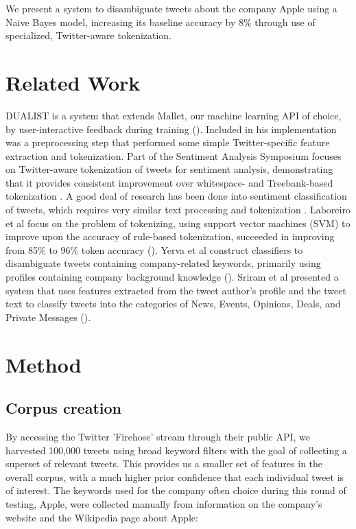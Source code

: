 \documentclass[letterpaper]{article}
\begin{document}
We present a system to disambiguate tweets about the company Apple using a Naive Bayes model, increasing its baseline accuracy by 8\% through use of specialized, Twitter-aware tokenization.

\section{Related Work}
DUALIST is a system that extends Mallet, our machine learning API of choice, by user-interactive feedback during training (\citeauthor{Settles:2011:CLF:2145432.2145588}). Included in his implementation was a preprocessing step that performed some simple Twitter-specific feature extraction and tokenization. Part of the Sentiment Analysis Symposium focuses on Twitter-aware tokenization of tweets for sentiment analysis, demonstrating that it provides consistent improvement over whitespace- and Treebank-based tokenization \cite{potts2011}. A good deal of research has been done into sentiment classification of tweets, which requires very similar text processing and tokenization \cite{Pak10}. Laboreiro et al focus on the problem of tokenizing, using support vector machines (SVM) to improve upon the accuracy of rule-based tokenization, succeeded in improving from 85\% to 96\% token accuracy (\citeauthor{Laboreiro:2010:TMM:1871840.1871853}). Yerva et al construct classifiers to disambiguate tweets containing company-related keywords, primarily using profiles containing company background knowledge (\citeauthor{journals/ijcsa/YervaMA12}). Sriram et al presented a system that uses features extracted from the tweet author's profile and the tweet text to classify tweets into the categories of News, Events, Opinions, Deals, and Private Messages (\citeauthor{Sriram:2010:STC:1835449.1835643}).

\section{Method}
\subsection{Corpus creation}
By accessing the Twitter 'Firehose' stream through their public API, we harvested 100,000 tweets using broad keyword filters with the goal of collecting a superset of relevant tweets. This provides us a smaller set of features in the overall corpus, with a much higher prior confidence that each individual tweet is of interest. The keywords used for the company often choice during this round of testing, Apple, were collected manually from information on the company's website and the Wikipedia page about Apple:\\
\end{document}
